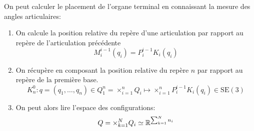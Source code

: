 \documentclass[math]{cours}
\begin{document}
\begin{proposition}
	On peut calculer le placement de l'organe terminal en connaissant la mesure des angles articulaires:
	\begin{enumerate}
		\item On calcule la position relative du repère d'une articulation par rapport au repère de l'articulation précédente
			\begin{equation*}
				M_{i}^{i - 1}(q_{i}) = P_{i}^{i- 1}K_{i}(q_{i})
			\end{equation*}
		\item On récupère en composant la position relative du repère $n$ par rapport au repère de la première base.
			\begin{equation*}
				K_{n}^{0} : q = (q_{1}, \ldots, q_{n}) \in Q_{1}^{n} = \times_{i = 1}^{n} Q_{i} \mapsto \times_{i = 1}^{n}P_{i}^{i - 1}K_{i}(q_{i}) \in \mathrm{SE}(3)
			\end{equation*}
		\item On peut alors lire l'espace des configurations:
		      \begin{equation*}
			      Q = \times_{k = 1}^{N} Q_{i} \simeq \mathbb{R}^{\sum_{k = 1}^{N} n_{i}}
		      \end{equation*}
	\end{enumerate}
	\label{prop:positiondirecte}
\end{proposition}
\end{document}

